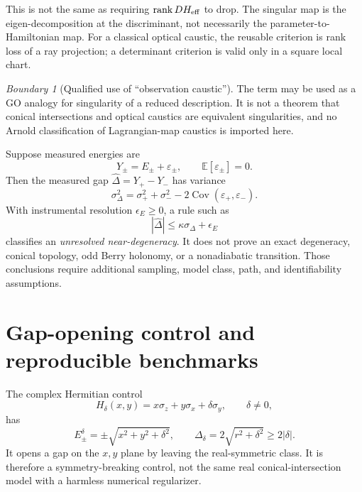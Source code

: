 \documentclass[11pt,a4paper]{article}
\theoremstyle{definition}
\theoremstyle{plain}
\theoremstyle{remark}
\newtheorem{warning}[definition]{Boundary}
\newcommand{\abs}[1]{\left\lvert #1\right\rvert}
\newcommand{\rank}{\operatorname{rank}}
\begin{document}
This is not the same as requiring \(\rank DH_{\rm eff}\) to drop.
The singular map is the eigen-decomposition at the discriminant, not
necessarily the parameter-to-Hamiltonian map.  For a classical
optical caustic, the reusable criterion is rank loss of a ray
projection; a determinant criterion is valid only in a square local
chart.

\begin{warning}[Qualified use of ``observation caustic'']
The term may be used as a GO analogy for singularity of a reduced
description. It is not a theorem that conical intersections and
optical caustics are equivalent singularities, and no Arnold
classification of Lagrangian-map caustics is imported here.
\end{warning}

Suppose measured energies are
\[
Y_\pm=E_\pm+\varepsilon_\pm,\qquad
\mathbb E[\varepsilon_\pm]=0.
\]
Then the measured gap
\(\widehat\Delta=Y_+-Y_-\) has variance
\begin{equation}\label{eq:gap-uncertainty}
\sigma_\Delta^2
=\sigma_+^2+\sigma_-^2
-2\operatorname{Cov}(\varepsilon_+,\varepsilon_-).
\end{equation}
With instrumental resolution \(\epsilon_E\ge0\), a rule such as
\begin{equation}\label{eq:unresolved-rule}
\abs{\widehat\Delta}
\le \kappa\sigma_\Delta+\epsilon_E
\end{equation}
classifies an \emph{unresolved near-degeneracy}. It does not prove an
exact degeneracy, conical topology, odd Berry holonomy, or a
nonadiabatic transition. Those conclusions require additional
sampling, model class, path, and identifiability assumptions.

\section{Gap-opening control and reproducible benchmarks}

The complex Hermitian control
\begin{equation}\label{eq:gapped-control}
H_\delta(x,y)=x\sigma_z+y\sigma_x+\delta\sigma_y,
\qquad \delta\ne0,
\end{equation}
has
\begin{equation}\label{eq:gapped-spectrum}
E_\pm^\delta=\pm\sqrt{x^2+y^2+\delta^2},\qquad
\Delta_\delta=2\sqrt{r^2+\delta^2}\ge2\abs{\delta}.
\end{equation}
It opens a gap on the \(x,y\) plane by leaving the real-symmetric
class. It is therefore a symmetry-breaking control, not the same
real conical-intersection model with a harmless numerical
regularizer.
\end{document}
